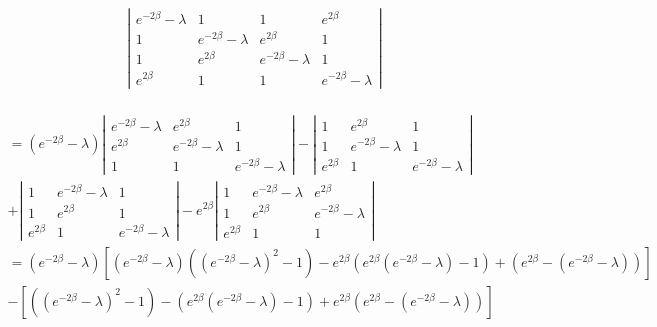 \documentclass[fleqn]{article}
\begin{document}
\begin{eqnarray}
\left| \begin{array}{cccc} e^{-2 \beta} - \lambda & 1 & 1 & e^{2 \beta} \\
1 & e^{-2 \beta} - \lambda & e^{2 \beta} & 1 \\
1 & e^{2 \beta} & e^{-2 \beta} - \lambda & 1 \\
e^{2 \beta} & 1 & 1 & e^{-2 \beta} - \lambda \end{array} \right| \\
\end{eqnarray}

\begin{eqnarray}
= (e^{-2 \beta} - \lambda) \left| \begin{array}{ccc} e^{-2 \beta} - \lambda & e^{2 \beta} & 1  \\
e^{2 \beta} & e^{-2 \beta} - \lambda & 1 \\
1 & 1 & e^{-2 \beta} - \lambda  \end{array} \right| 
- \left| \begin{array}{ccc} 1 & e^{2 \beta} & 1 \\
1 & e^{-2 \beta} - \lambda & 1 \\
e^{2 \beta} & 1 & e^{-2 \beta} - \lambda  \end{array} \right| \\
+ \left| \begin{array}{ccc} 1 & e^{-2 \beta} - \lambda & 1 \\
1 & e^{2 \beta} & 1 \\
e^{2 \beta} & 1 & e^{-2 \beta} - \lambda  \end{array} \right| 
-e^{2 \beta} \left| \begin{array}{ccc} 1 & e^{-2 \beta} - \lambda & e^{2 \beta} \\
1 & e^{2 \beta} & e^{-2 \beta} - \lambda \\
e^{2 \beta} & 1 & 1  \end{array} \right| \\
= (e^{-2 \beta} - \lambda) \left[ (e^{-2 \beta} - \lambda) \left( (e^{-2 \beta} - \lambda)^2 - 1 \right) - e^{2 \beta} \left( e^{2 \beta} (e^{-2 \beta} - \lambda) - 1 \right) + (e^{2 \beta} - (e^{-2 \beta} - \lambda) ) \right] \\
- \left[ \left( (e^{-2 \beta} - \lambda)^2 -1 \right) - \left( e^{2 \beta} (e^{-2 \beta} - \lambda) - 1 \right) + e^{2 \beta} \left( e^{2 \beta} - (e^{-2 \beta} - \lambda) \right) \right] \\

\end{eqnarray}
\end{document}
